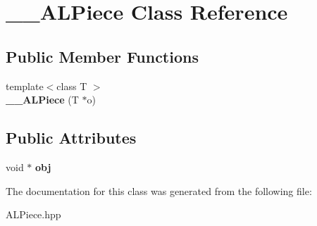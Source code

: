 \hypertarget{class____ALPiece}{\section{\-\_\-\-\_\-\-A\-L\-Piece \-Class \-Reference}
\label{class____ALPiece}
}
\subsection*{\-Public \-Member \-Functions}
\begin{DoxyCompactItemize}
\item 
\hypertarget{class____ALPiece_acb440c1d3133fd169991ba0b3b6744df}{{\footnotesize template$<$class T $>$ }\\{\bfseries \-\_\-\-\_\-\-A\-L\-Piece} (\-T $\ast$o)}\label{class____ALPiece_acb440c1d3133fd169991ba0b3b6744df}

\end{DoxyCompactItemize}
\subsection*{\-Public \-Attributes}
\begin{DoxyCompactItemize}
\item 
\hypertarget{class____ALPiece_a36db65740f7c33d3ea839b87f3b92d3a}{void $\ast$ {\bfseries obj}}\label{class____ALPiece_a36db65740f7c33d3ea839b87f3b92d3a}

\end{DoxyCompactItemize}


\-The documentation for this class was generated from the following file\-:\begin{DoxyCompactItemize}
\item 
\-A\-L\-Piece.\-hpp\end{DoxyCompactItemize}
